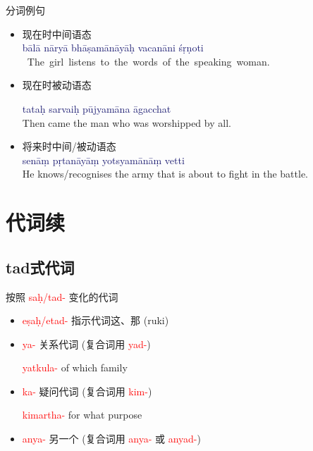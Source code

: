 \documentclass[17pt]{beamer}
\newcommand{\nounstem}[1]{\textcolor{red}{#1\nobreakdash-}}
\newcommand{\fullsentence}[1]{\textcolor{MidnightBlue}{#1}}
\begin{document}
\begin{frame}{分词例句}
  \begin{itemize}
    \item 现在时中间语态\\
    {\small
    \fullsentence{bālā nāryā bhāṣamānāyāḥ vacanāni śṛṇoti }\\}
    \mbox{\footnotesize
    The girl listens to the words of the speaking woman. 
    }
    \item 现在时被动语态
    
    {\small
    \fullsentence{tataḥ sarvaiḥ pūjyamāna āgacchat }\\}
    {\footnotesize
    Then came the man who was worshipped by all. }

    \item 将来时中间/被动语态\\
    {\small
    \fullsentence{senāṃ pṛtanāyāṃ yotsyamānāṃ vetti }\\}
    {\footnotesize
    He knows/recognises the army that is about to fight in the battle.  }
  \end{itemize}
\end{frame}


\section{代词续}

\subsection{tad式代词}
\begin{frame}{按照 \nounstem{saḥ/tad} 变化的代词}
  \begin{itemize}
    \item \nounstem{eṣaḥ/etad} 指示代词这、那 (ruki)
    \item \nounstem{ya} 关系代词 (复合词用 \nounstem{yad})
    
    \nounstem{yatkula} of which family
    \item \nounstem{ka} 疑问代词 (复合词用 \nounstem{kim})
    
    \nounstem{kimartha} for what purpose
    \item \nounstem{anya} 另一个 (复合词用 \nounstem{anya} 或 \nounstem{anyad})
  \end{itemize}
\end{frame}
\end{document}
